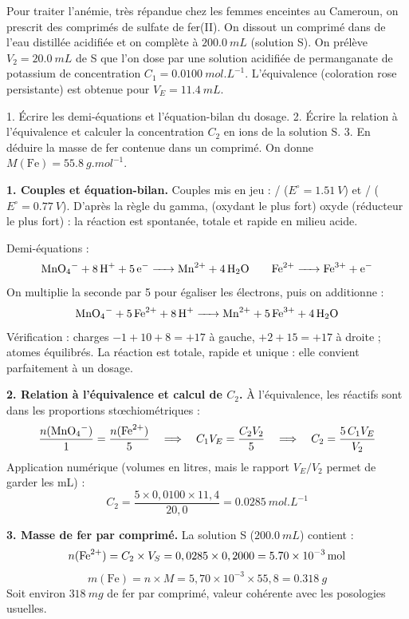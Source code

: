 \documentclass[11pt]{article}
\newcounter{popsec}
\newcounter{popsub}
\newcommand{\courssub}[1]{%
  \stepcounter{popsub}%
  \par\vspace{9pt}\noindent{\popxbold\fontsize{11.5}{13}\selectfont\color{popink}{\color{poporange}\thepopsec.\thepopsub}\hspace{6pt}#1}\par\nopagebreak\vspace{4pt}
}
\begin{document}
\courssub{Exercice résolu type Probatoire}

\begin{exoresolu}
Pour traiter l'anémie, très répandue chez les femmes enceintes au Cameroun, on prescrit des comprimés de sulfate de fer(II). On dissout un comprimé dans de l'eau distillée acidifiée et on complète à $\SI{200,0}{mL}$ (solution S). On prélève $V_2 = \SI{20,0}{mL}$ de S que l'on dose par une solution acidifiée de permanganate de potassium de concentration $C_1 = \SI{0,0100}{mol.L^{-1}}$. L'équivalence (coloration rose persistante) est obtenue pour $V_E = \SI{11,4}{mL}$.

1. Écrire les demi-équations et l'équation-bilan du dosage.
2. Écrire la relation à l'équivalence et calculer la concentration $C_2$ en ions  de la solution S.
3. En déduire la masse de fer contenue dans un comprimé. On donne $M(\text{Fe}) = \SI{55,8}{g.mol^{-1}}$.

\tcblower
\textbf{1. Couples et équation-bilan.} Couples mis en jeu : / ($E^\circ = \SI{1,51}{V}$) et / ($E^\circ = \SI{0,77}{V}$). D'après la règle du gamma,  (oxydant le plus fort) oxyde  (réducteur le plus fort) : la réaction est spontanée, totale et rapide en milieu acide.

Demi-équations :
\[ \ce{MnO4- + 8H+ + 5e- -> Mn^2+ + 4H2O} \qquad \ce{Fe^2+ -> Fe^3+ + e-} \]
On multiplie la seconde par 5 pour égaliser les électrons, puis on additionne :
\[ \ce{MnO4- + 5Fe^2+ + 8H+ -> Mn^2+ + 5Fe^3+ + 4H2O} \]
Vérification : charges $-1 + 10 + 8 = +17$ à gauche, $+2 + 15 = +17$ à droite ; atomes équilibrés. La réaction est totale, rapide et unique : elle convient parfaitement à un dosage.

\textbf{2. Relation à l'équivalence et calcul de $C_2$.} À l'équivalence, les réactifs sont dans les proportions stœchiométriques :
\[ \frac{n(\ce{MnO4-})}{1} = \frac{n(\ce{Fe^2+})}{5} \quad \Longrightarrow \quad C_1 V_E = \frac{C_2 V_2}{5} \quad \Longrightarrow \quad C_2 = \frac{5\,C_1 V_E}{V_2} \]
Application numérique (volumes en litres, mais le rapport $V_E/V_2$ permet de garder les \si{mL}) :
\[ C_2 = \frac{5 \times 0,0100 \times 11,4}{20,0} = \SI{0,0285}{mol.L^{-1}} \]

\textbf{3. Masse de fer par comprimé.} La solution S ($\SI{200,0}{mL}$) contient :
\[ n(\ce{Fe^2+}) = C_2 \times V_S = 0,0285 \times 0,2000 = \SI{5,70e-3}{mol} \]
\[ m(\text{Fe}) = n \times M = 5,70 \times 10^{-3} \times 55,8 = \SI{0,318}{g} \]
Soit environ $\SI{318}{mg}$ de fer par comprimé, valeur cohérente avec les posologies usuelles.
\end{exoresolu}
\end{document}

